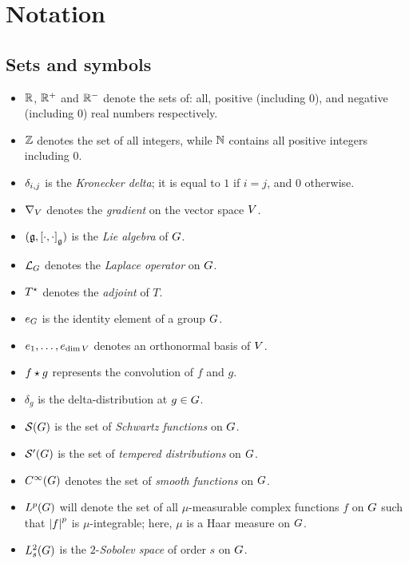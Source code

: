 \chapter*{Notation}

\section*{Sets and symbols}

\begin{itemize}
    \item $\mathbb{R}$, $\mathbb{R}^+$ and $\mathbb{R}^-$ denote the sets of: all, positive (including $0$), and negative (including $0$) real numbers respectively.
    \item $\mathbb{Z}$ denotes the set of all integers,
        while $\mathbb{N}$ contains all positive integers including $0$.
    \item $\delta_{i,j}$ is the \emph{Kronecker delta};
        it is equal to $1$ if $i = j$,
        and $0$ otherwise.
    \item $\nabla_{V}$ denotes the \emph{gradient} on the vector space $V$.
    \item $(\mathfrak{g}, {[\cdot, \cdot]}_{\mathfrak{g}})$ is the \emph{Lie algebra} of $G$.
    \item ${\mathcal{L}_{G}}$ denotes the \emph{Laplace operator} on $G$.
    \item ${T}^\star$ denotes the \emph{adjoint} of $T$.
    \item $e_G$ is the identity element of a group $G$.
    \item $e_1, \dots, e_{\dim V}$ denotes an orthonormal basis of $V$.
    \item $f \star g$ represents the convolution of $f$ and $g$.
    \item $\delta_g$ is the delta-distribution at $g \in G$.
    \item ${\mathcal{S} (G)}$ is the set of \emph{Schwartz functions} on $G$.
    \item ${\mathcal{S}' (G)}$ is the set of \emph{tempered distributions} on $G$.
    \item ${C^\infty(G)}$ denotes the set of \emph{smooth functions} on $G$.
    \item ${L^{p} (G)}$ will denote the set of all $\mu$-measurable complex functions $f$ on $G$ such that $\left|{f}\right|^p$ is $\mu$-integrable;
        here, $\mu$ is a Haar measure on $G$.
    \item $L^2_{s}(G)$ is the $2$-\emph{Sobolev space} of order $s$ on $G$.

\end{itemize}
